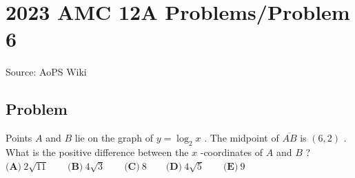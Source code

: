 \documentclass[12pt]{article}
\begin{document}
\section*{{2023 AMC 12A Problems/Problem 6}}
Source: AoPS Wiki

\subsection*{Problem}
Points $A$ and $B$ lie on the graph of $y=\log_{2}x$ . The midpoint of $\overline{AB}$ is $(6, 2)$ . What is the positive difference between the $x$ -coordinates of $A$ and $B$ ? $\textbf{(A)}~2\sqrt{11}\qquad\textbf{(B)}~4\sqrt{3}\qquad\textbf{(C)}~8\qquad\textbf{(D)}~4\sqrt{5}\qquad\textbf{(E)}~9$
\end{document}
